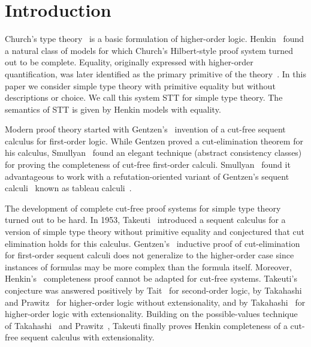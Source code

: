 \section{Introduction}

Church's type theory~\cite{Church40} is a basic
formulation of higher-order logic.
Henkin~\cite{Henkin50} found a natural class of models
for which Church's Hilbert-style proof system turned
out to be complete.  Equality, originally expressed
with higher-order quantification, was later identified
as the primary primitive of the
theory~\cite{Henkin63,Andrews72a,AndrewsBook}.
In this paper we consider simple type theory with
primitive equality but without descriptions or choice.
We call this system STT for simple type
theory.  The semantics of STT is given by Henkin
models with equality.


Modern proof theory started with
Gentzen's~\cite{Gentzen1935} invention of a cut-free
sequent calculus for first-order logic.  While Gentzen
proved a cut-elimination theorem for his calculus,
Smullyan~\cite{SmullyanBook} found an elegant technique
(abstract consistency classes) for proving the
completeness of cut-free first-order calculi.
Smullyan~\cite{SmullyanBook} found it advantageous to
work with a refutation-oriented variant of Gentzen's
sequent calculi~\cite{Gentzen1935} known as tableau
calculi~\cite{Beth1955,Hintikka1955,SmullyanBook}.

The development of complete cut-free proof systems for
simple type theory turned out to be hard.  In 1953,
Takeuti~\cite{Takeuti53} introduced a sequent calculus
for a version of simple type theory without primitive equality
and conjectured that cut elimination holds for
this calculus.  Gentzen's~\cite{Gentzen1935} inductive
proof of cut-elimination for first-order sequent
calculi does not generalize to the higher-order case
since instances of formulas may be more complex than
the formula itself.
Moreover, Henkin's~\cite{Henkin50} completeness proof
cannot be adapted for cut-free systems.  Takeuti's
conjecture was answered positively by
Tait~\cite{Tait66} for second-order logic, by
Takahashi~\cite{Takahashi67} and
Prawitz~\cite{Prawitz68} for higher-order logic without
extensionality, and by Takahashi~\cite{Takahashi68} for
higher-order logic with extensionality.  
Building on
the possible-values technique of
Takahashi~\cite{Takahashi67} and
Prawitz~\cite{Prawitz68}, Takeuti \cite{Takeuti75}
finally proves Henkin completeness of a cut-free
sequent calculus with extensionality.



